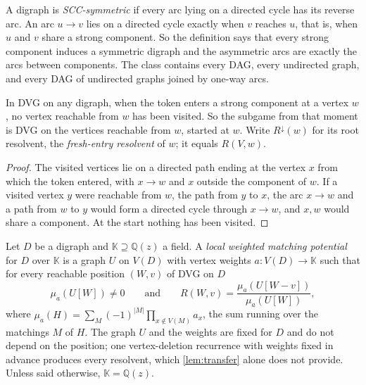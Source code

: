 \documentclass[final]{siamart0516}
\numberwithin{theorem}{section}
\numberwithin{equation}{section}
\theoremstyle{siamnonum}
\renewenvironment{definition*}{\definitionstar}{\enddefinitionstar}
\theoremstyle{plain}
\newcommand{\QQ}{\mathbb{Q}}
\newcommand{\Qz}{\QQ(z)}
\newcommand{\Rdown}{R^{\downarrow}}
\begin{document}
\begin{definition*}
A digraph is \emph{SCC-symmetric} if every arc lying on a directed cycle has its reverse arc. An arc $u\to v$ lies on a directed cycle exactly when $v$ reaches $u$, that is, when $u$ and $v$ share a strong component. So the definition says that every strong component induces a symmetric digraph and the asymmetric arcs are exactly the arcs between components. The class contains every DAG, every undirected graph, and every DAG of undirected graphs joined by one-way arcs.
\end{definition*}

\begin{lemma}\label{lem:entry}
In DVG on any digraph, when the token enters a strong component at a vertex $w$, no vertex reachable from $w$ has been visited. So the subgame from that moment is DVG on the vertices reachable from $w$, started at $w$. Write $\Rdown(w)$ for its root resolvent, the \emph{fresh-entry resolvent} of $w$; it equals $R(V,w)$.
\end{lemma}
\begin{proof}
The visited vertices lie on a directed path ending at the vertex $x$ from which the token entered, with $x\to w$ and $x$ outside the component of $w$. If a visited vertex $y$ were reachable from $w$, the path from $y$ to $x$, the arc $x\to w$ and a path from $w$ to $y$ would form a directed cycle through $x\to w$, and $x,w$ would share a component. At the start nothing has been visited.
\end{proof}

\begin{definition*}
Let $D$ be a digraph and $\mathbb K\supseteq\Qz$ a field. A \emph{local weighted matching potential} for $D$ over $\mathbb K$ is a graph $U$ on $V(D)$ with vertex weights $a\colon V(D)\to\mathbb K$ such that for every reachable position $(W,v)$ of DVG on $D$
\[
\mu_a(U[W])\neq0\qquad\text{and}\qquad R(W,v)=\frac{\mu_a(U[W-v])}{\mu_a(U[W])},
\]
where $\mu_a(H)=\sum_{M}(-1)^{|M|}\prod_{x\notin V(M)}a_x$, the sum running over the matchings $M$ of $H$. The graph $U$ and the weights are fixed for $D$ and do not depend on the position; one vertex-deletion recurrence with weights fixed in advance produces every resolvent, which \cref{lem:transfer} alone does not provide. Unless said otherwise, $\mathbb K=\Qz$.
\end{definition*}
\end{document}
